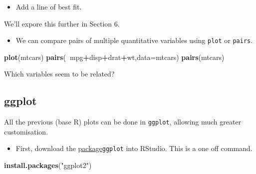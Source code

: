 \documentclass[]{article}
\newenvironment{Shaded}{\begin{snugshade}}{\end{snugshade}}
\newcommand{\DataTypeTok}[1]{\textcolor[rgb]{0.13,0.29,0.53}{#1}}
\newcommand{\KeywordTok}[1]{\textcolor[rgb]{0.13,0.29,0.53}{\textbf{#1}}}
\newcommand{\NormalTok}[1]{#1}
\newcommand{\OperatorTok}[1]{\textcolor[rgb]{0.81,0.36,0.00}{\textbf{#1}}}
\newcommand{\StringTok}[1]{\textcolor[rgb]{0.31,0.60,0.02}{#1}}
\providecommand{\tightlist}{%
  \setlength{\itemsep}{0pt}\setlength{\parskip}{0pt}}
\begin{document}
\begin{itemize}
\tightlist
\item
  Add a line of best fit.
\end{itemize}

\begin{Shaded}
\end{Shaded}

We'll expore this further in Section 6.

\begin{itemize}
\tightlist
\item
  We can compare pairs of multiple quantitative variables using \texttt{plot} or \texttt{pairs}.
\end{itemize}

\begin{Shaded}
\begin{Highlighting}[]
\KeywordTok{plot}\NormalTok{(mtcars)}
\KeywordTok{pairs}\NormalTok{(}\OperatorTok{~}\NormalTok{mpg}\OperatorTok{+}\NormalTok{disp}\OperatorTok{+}\NormalTok{drat}\OperatorTok{+}\NormalTok{wt,}\DataTypeTok{data=}\NormalTok{mtcars)}
\KeywordTok{pairs}\NormalTok{(mtcars)}
\end{Highlighting}
\end{Shaded}

Which variables seem to be related?

\hypertarget{ggplot}{%
\subsection{ggplot}\label{ggplot}}

All the previous (base R) plots can be done in \texttt{ggplot}, allowing much greater customisation.

\begin{itemize}
\tightlist
\item
  First, download the \href{http://tidyverse.org/}{package}\texttt{ggplot} into RStudio. This is a one off command.
\end{itemize}

\begin{Shaded}
\begin{Highlighting}[]
\KeywordTok{install.packages}\NormalTok{(}\StringTok{"ggplot2"}\NormalTok{)}
\end{Highlighting}
\end{Shaded}
\end{document}
